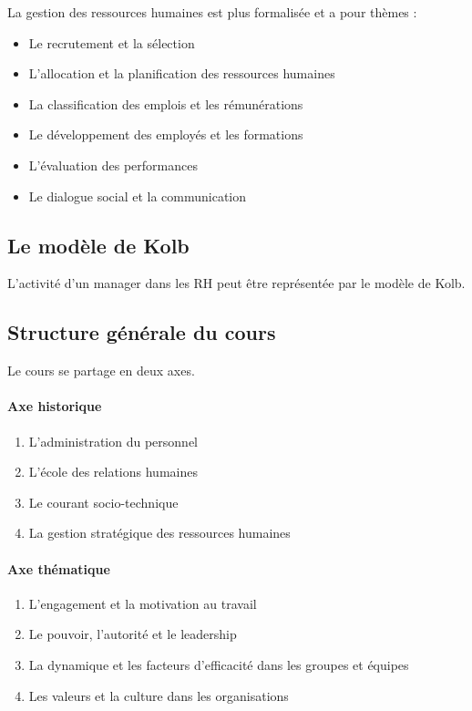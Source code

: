 \documentclass[12pt]{article}
\begin{document}
      La gestion des ressources humaines est plus formalisée et a pour thèmes :
      
      \begin{itemize}
       \item Le recrutement et la sélection
       \item L'allocation et la planification des ressources humaines
       \item La classification des emplois et les rémunérations
       \item Le développement des employés et les formations
       \item L'évaluation des performances
       \item Le dialogue social et la communication
      \end{itemize}
      
  \subsection{Le modèle de Kolb}
  
  L'activité d'un manager dans les RH peut être représentée par le modèle de Kolb.
  
  
  \subsection{Structure générale du cours}
    Le cours se partage en deux axes.
    
    \paragraph{Axe historique}
      \begin{enumerate}
       \item L'administration du personnel
       \item L'école des relations humaines
       \item Le courant socio-technique
       \item La gestion stratégique des ressources humaines
      \end{enumerate}
    
    \paragraph{Axe thématique}
      \begin{enumerate}
       \item L'engagement et la motivation au travail
       \item Le pouvoir, l'autorité et le leadership
       \item La dynamique et les facteurs d'efficacité dans les groupes et équipes
       \item Les valeurs et la culture dans les organisations
      \end{enumerate}
\end{document}
